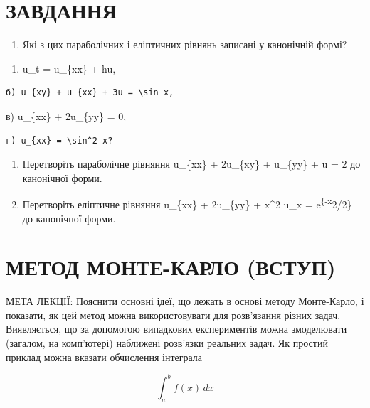 \documentclass[
  ukrainian,
]{article}
\providecommand{\tightlist}{%
  \setlength{\itemsep}{0pt}\setlength{\parskip}{0pt}}
\begin{document}
\section{ЗАВДАННЯ}\label{ux437ux430ux432ux434ux430ux43dux43dux44f-11}

\begin{enumerate}
\def\labelenumi{\arabic{enumi}.}
\tightlist
\item
  Які з цих параболічних і еліптичних рівнянь записані у канонічній
  формі?
\end{enumerate}

\begin{enumerate}
\def\labelenumi{\alph{enumi})}
\tightlist
\item
  u\_t = u\_\{xx\} + hu,
\end{enumerate}

\begin{verbatim}
б) u_{xy} + u_{xx} + 3u = \sin x,
\end{verbatim}

в) u\_\{xx\} + 2u\_\{yy\} = 0,

\begin{verbatim}
г) u_{xx} = \sin^2 x?
\end{verbatim}

\begin{enumerate}
\def\labelenumi{\arabic{enumi}.}
\setcounter{enumi}{1}
\item
  Перетворіть параболічне рівняння u\_\{xx\} + 2u\_\{xy\} + u\_\{yy\} +
  u = 2 до канонічної форми.
\item
  Перетворіть еліптичне рівняння u\_\{xx\} + 2u\_\{yy\} + x\^{}2 u\_x =
  e\textsuperscript{\{-x}2/2\} до канонічної форми.
\end{enumerate}

\section{МЕТОД МОНТЕ-КАРЛО
(ВСТУП)}\label{ux43cux435ux442ux43eux434-ux43cux43eux43dux442ux435-ux43aux430ux440ux43bux43e-ux432ux441ux442ux443ux43f}

МЕТА ЛЕКЦІЇ: Пояснити основні ідеї, що лежать в основі методу
Монте-Карло, і показати, як цей метод можна використовувати для
розв'язання різних задач. Виявляється, що за допомогою випадкових
експериментів можна змоделювати (загалом, на комп'ютері) наближені
розв'язки реальних задач. Як простий приклад можна вказати обчислення
інтеграла

\[
\int_a^b f(x)\,dx
\]
\end{document}
